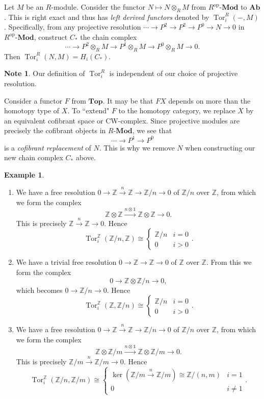 \documentclass[10pt,letterpaper,cm]{nupset}
\theoremstyle{definition}
\newtheorem{exmp}[definition]{Example}
\newtheorem{note}[definition]{Note}
\theoremstyle{theorem}
\theoremstyle{remark}
\newcommand{\Z}{\mathbb Z}
\newcommand{\1}{\mathbb{1}}
\newcommand{\0}{\vec 0}
\DeclareMathOperator{\tor}{Tor}
\DeclareMathOperator{\op}{op}
\begin{document}
\medskip

Let $M$ be an $R$-module. Consider the functor $N \mapsto N \otimes_R M$ from $R^{\op}\text{-}\mathbf{Mod}$ to $\mathbf{Ab}$. This is right exact and thus has \textit{left derived functors}  denoted by $\tor_i^R({-}, M)$.  Specifically, from any projective resolution $\cdots \to P^2 \to P^2 \to P^0 \to N\to 0$ in $R^{\op}\text{-}\mathbf{Mod}$, construct $C_{\ast}$ the chain complex $$\cdots  \to P^2 \otimes_R M\to  P^1 \otimes_R M\to  P^0 \otimes_R M  \to 0.$$ Then $\tor_i^R(N, M) = H_i(C_{\ast}).$
\begin{note}
Our definition of $\tor_i^{R}$ is independent of our choice of projective resolution. 
\end{note}

\smallskip

Consider a functor $F$ from $\mathbf{Top}$. It may be that $FX$ depends on more than the homotopy type of $X$. To ``extend" $F$ to the homotopy category, we replace $X$ by an equivalent cofibrant space or CW-complex. Since projective modules are precisely the cofibrant objects in $R\text{-}\mathbf{Mod}$, we see that $$ \cdots \to P^1 \to P^0$$ is a \textit{cofibrant replacement} of $N$. This is why we remove $N$ when constructing our new chain complex $C_{\ast}$ above.

\begin{exmp} $ $
\begin{enumerate}
\item We have a free resolution $0 \to \Z \overset{n}{\longrightarrow} \Z \to \Z/n \to 0$ of $\Z/n$ over $\Z$, from which we form the complex $$ \Z \otimes \Z \overset{n \otimes \1}{\longrightarrow} \Z \otimes \Z  \to 0   .$$ This is precisely $ \Z \overset{n}{\longrightarrow} \Z \to 0$. Hence $$\tor_i^{\Z}(\Z/n, \Z) \cong  \begin{cases} \Z/n & i =0 \\ 0 & i >0 \end{cases} .$$
\item We have a trivial free resolution $0 \to \Z \to \Z \to 0$ of $\Z$ over $\Z$. From this we form the complex $$ 0 \to \Z \otimes \Z /n  \to 0, $$ which becomes $0 \to \Z/n \to 0$. Hence $$\tor_i^{\Z}(\Z, \Z/n) \cong  \begin{cases} \Z/n & i =0 \\ 0 & i >0 \end{cases} .$$
\item We have a free resolution $0 \to \Z \overset{n}{\longrightarrow} \Z \to \Z/n \to 0$ of $\Z/n$ over $\Z$, from which we form the complex $$ \Z \otimes \Z/m \overset{n \otimes \1}{\longrightarrow} \Z \otimes \Z/m  \to 0   .$$ This is precisely $ \Z/m \overset{n}{\longrightarrow} \Z/m \to 0$. Hence $$\tor^{\Z}_i(\Z/n, \Z/m) \cong \begin{cases} \ker( \Z/m \overset{n}{\longrightarrow} \Z/m) \cong  \Z/(n,m) & i =1 \\ 0 & i \ne 1 \end{cases}.$$
\end{enumerate}
\end{exmp}
\end{document}

